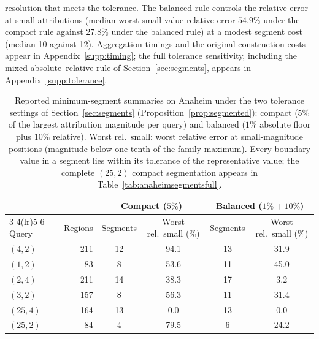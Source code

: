 resolution that meets the tolerance. The balanced rule controls the
relative error at small attributions (median worst small-value relative
error $54.9\%$ under the compact rule against $27.8\%$ under the
balanced rule) at a modest segment cost (median 10 against 12).
Aggregation timings and the original construction costs appear in
Appendix~\ref{supp:timing}; the full tolerance sensitivity, including
the mixed absolute--relative rule of Section~\ref{sec:segments},
appears in Appendix~\ref{supp:tolerance}.
\begin{table}[t]\centering\footnotesize
\caption{Reported minimum-segment summaries on Anaheim under the two
tolerance settings of Section~\ref{sec:segments}
(Proposition~\ref{prop:segmented}): compact ($5\%$ of the largest
attribution magnitude per query) and balanced ($1\%$ absolute floor
plus $10\%$ relative). Worst rel.\ small: worst relative error at
small-magnitude positions (magnitude below one tenth of the family
maximum). Every boundary value in a segment lies
within its tolerance of the representative value; the complete $(25,2)$
compact segmentation appears in
Table~\ref{tab:anaheimsegmentsfull}.}\label{tab:anaheimsegments}
\setlength{\tabcolsep}{4pt}
\begin{tabular*}{\tblwidth}{@{\extracolsep{\fill}}lrcccc}
\toprule
 & & \multicolumn{2}{c}{Compact ($5\%$)} & \multicolumn{2}{c}{Balanced ($1\%{+}10\%$)}\\
\cmidrule(lr){3-4}\cmidrule(lr){5-6}
Query & Regions & Segments & Worst rel.\ small (\%) & Segments & Worst rel.\ small (\%)\\
\midrule
$(4,2)$ & 211 & 12 & 94.1 & 13 & 31.9\\
$(1,2)$ & 83 & 8 & 53.6 & 11 & 45.0\\
$(2,4)$ & 211 & 14 & 38.3 & 17 & 3.2\\
$(3,2)$ & 157 & 8 & 56.3 & 11 & 31.4\\
$(25,4)$ & 164 & 13 & 0.0 & 13 & 0.0\\
$(25,2)$ & 84 & 4 & 79.5 & 6 & 24.2\\
\bottomrule\end{tabular*}\end{table}
